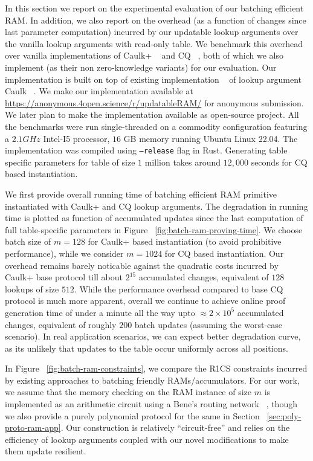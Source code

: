 In this section we report on the experimental evaluation of our batching efficient RAM.
In addition, we also report on the overhead (as a function of changes since last parameter computation)
incurred by our updatable lookup arguments over the vanilla lookup arguments with read-only table. We
benchmark this overhead over vanilla implementations of Caulk+ ~\cite{EPRINT:PosKat22} and
CQ ~\cite{EPRINT:EagFioGab22}, both of which we also implement (as their non zero-knowledge variants)
for our evaluation. Our implementation is built on top of existing implementation ~\cite{caulk-implementation}
of lookup argument Caulk ~\cite{CCS:ZBKMNS22}. We make our implementation available at
\url{https://anonymous.4open.science/r/updatableRAM/} for anonymous submission. We later plan to
make the implementation available as open-source project.
All the benchmarks were run single-threaded on a commodity configuration featuring a $2.1GHz$ Intel-I5 processor,
$16$ GB memory running Ubuntu Linux 22.04. The implementation was compiled using {\tt --release}
flag in Rust. Generating table specific parameters for table of size $1$ million takes around $12,000$
seconds for CQ based instantiation.

We first provide overall running time of batching efficient RAM primitive instantiated with Caulk+
and CQ lookup arguments. The degradation in running time is plotted as function of accumulated updates
since the last computation of full table-specific parameters in Figure ~\ref{fig:batch-ram-proving-time}.
We choose batch size of $m=128$ for Caulk+ based instantiation (to avoid prohibitive performance),
while we consider $m=1024$ for CQ based instantiation. Our overhead remains barely noticable against
the quadratic costs incurred by Caulk+ base protocol till about $2^{15}$ accumulated changes, equivalent of
$128$ lookups of size $512$. While the performance overhead compared to base CQ protocol is much more apparent,
overall we continue to achieve online proof generation time of under a minute all the way upto
$\approx 2\times 10^5$ accumulated changes, equivalent of roughly $200$ batch updates (assuming the worst-case
scenario). In real application scenarios, we can expect better degradation curve, as its unlikely that updates
to the table occur uniformly across all positions.

In Figure ~\ref{fig:batch-ram-constraints}, we compare the
R1CS constraints incurred by existing approaches to batching friendly RAMs/accumulators. For our work, we assume
that the memory checking on the RAM instance of size $m$ is implemented as an arithmetic circuit using a Bene's
routing network ~\cite{benes}, though we also provide a purely polynomial protocol for the same in Section ~\ref{sec:poly-proto-ram-app}.
Our construction is relatively ``circuit-free'' and relies on the efficiency of lookup arguments coupled with
our novel modifications to make them update resilient.

